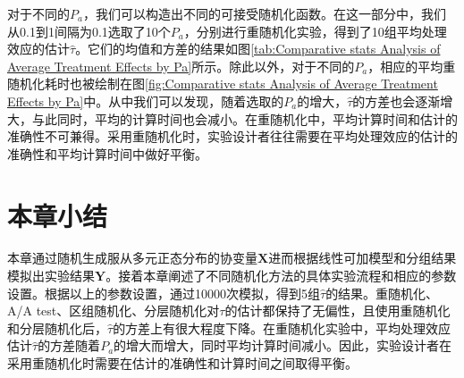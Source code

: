 对于不同的$P_a$，我们可以构造出不同的可接受随机化函数。在这一部分中，我们从0.1到1间隔为0.1选取了10个$P_a$，分别进行重随机化实验，得到了10组平均处理效应的估计$\hat{\tau}$。它们的均值和方差的结果如图\ref{tab:Comparative stats Analysis of Average Treatment Effects by Pa}所示。除此以外，对于不同的$P_a$，相应的平均重随机化耗时也被绘制在图\ref{fig:Comparative stats Analysis of Average Treatment Effects by Pa}中。从中我们可以发现，随着选取的$P_a$的增大，$\hat{\tau}$的方差也会逐渐增大，与此同时，平均的计算时间也会减小。在重随机化中，平均计算时间和估计的准确性不可兼得。采用重随机化时，实验设计者往往需要在平均处理效应的估计的准确性和平均计算时间中做好平衡。

\section{本章小结}
本章通过随机生成服从多元正态分布的协变量$\mathbf{X}$进而根据线性可加模型和分组结果模拟出实验结果$\mathbf{Y}$。接着本章阐述了不同随机化方法的具体实验流程和相应的参数设置。根据以上的参数设置，通过10000次模拟，得到5组$\hat{\tau}$的结果。重随机化、A/A test、区组随机化、分层随机化对$\tau$的估计都保持了无偏性，且使用重随机化和分层随机化后，$\hat{\tau}$的方差上有很大程度下降。在重随机化实验中，平均处理效应估计$\hat{\tau}$的方差随着$P_a$的增大而增大，同时平均计算时间减小。因此，实验设计者在采用重随机化时需要在估计的准确性和计算时间之间取得平衡。
